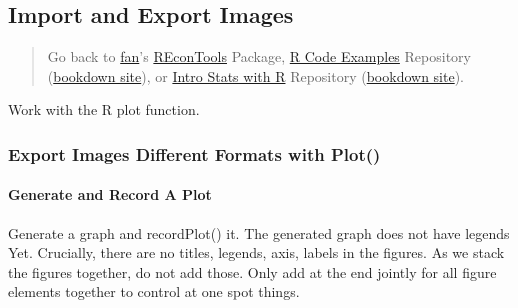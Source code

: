 \documentclass[
]{book}
\begin{document}
\hypertarget{import-and-export-images}{%
\subsection{Import and Export Images}\label{import-and-export-images}}

\begin{quote}
Go back to \href{http://fanwangecon.github.io/}{fan}'s \href{https://fanwangecon.github.io/REconTools/}{REconTools} Package, \href{https://fanwangecon.github.io/R4Econ/}{R Code Examples} Repository (\href{https://fanwangecon.github.io/R4Econ/bookdown}{bookdown site}), or \href{https://fanwangecon.github.io/Stat4Econ/}{Intro Stats with R} Repository (\href{https://fanwangecon.github.io/Stat4Econ/bookdown}{bookdown site}).
\end{quote}

Work with the R plot function.

\hypertarget{export-images-different-formats-with-plot}{%
\subsubsection{Export Images Different Formats with Plot()}\label{export-images-different-formats-with-plot}}

\hypertarget{generate-and-record-a-plot}{%
\paragraph{Generate and Record A Plot}\label{generate-and-record-a-plot}}

Generate a graph and recordPlot() it. The generated graph does not have legends Yet. Crucially, there are no titles, legends, axis, labels in the figures. As we stack the figures together, do not add those. Only add at the end jointly for all figure elements together to control at one spot things.
\end{document}
